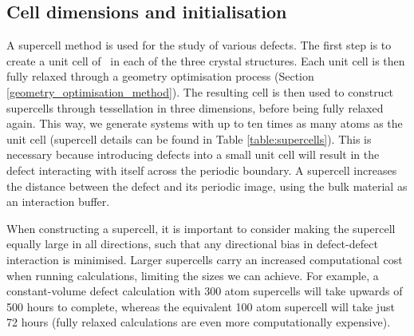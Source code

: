 \subsection{Cell dimensions and initialisation}

A supercell method is used for the study of various defects. The first step is to create a unit cell of \zirconia\ in each of the three crystal structures. Each unit cell is then fully relaxed through a geometry optimisation process (Section \ref{geometry_optimisation_method}). The resulting cell is then used to construct supercells through tessellation in three dimensions, before being fully relaxed again. This way, we generate systems with up to ten times as many atoms as the unit cell (supercell details can be found in Table \ref{table:supercells}). This is necessary because introducing defects into a small unit cell will result in the defect interacting with itself across the periodic boundary. A supercell increases the distance between the defect and its periodic image, using the bulk material as an interaction buffer. 

When constructing a supercell, it is important to consider making the supercell equally large in all directions, such that any directional bias in defect-defect interaction is minimised. Larger supercells carry an increased computational cost when running calculations, limiting the sizes we can achieve. For example, a constant-volume defect calculation with 300 atom supercells will take upwards of 500 hours to complete, whereas the equivalent 100 atom supercell will take just 72 hours (fully relaxed calculations are even more computationally expensive).


